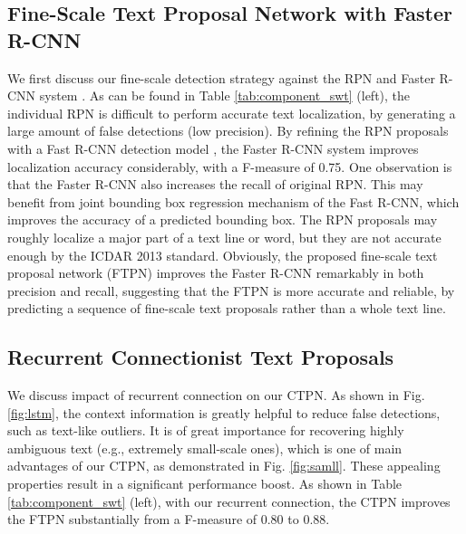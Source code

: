 \documentclass[runningheads]{llncs}
\begin{document}


\subsection{Fine-Scale Text Proposal Network with Faster R-CNN}


We first discuss our fine-scale detection strategy against the RPN and Faster R-CNN system \cite{Ren2015}.  As can be found in Table \ref{tab:component_swt} (left), the individual RPN is difficult to perform accurate text localization, by generating a large amount of false detections (low precision). By refining the RPN proposals with a Fast R-CNN detection model \cite{Girshick2015}, the Faster R-CNN system improves  localization accuracy considerably, with a F-measure of 0.75.  One observation is that the Faster R-CNN also increases the recall of original RPN. This may benefit from joint bounding box regression mechanism of the Fast R-CNN, which improves the accuracy of a predicted bounding box. The RPN proposals may roughly localize a major part of a text line or word, but they are not accurate enough by the ICDAR 2013  standard. Obviously, the proposed fine-scale text proposal network (FTPN) improves the Faster R-CNN remarkably in both precision and recall, suggesting that the FTPN is more accurate and reliable,  by predicting a sequence of fine-scale text proposals rather than a whole  text line. 

\subsection{Recurrent Connectionist Text Proposals}
We discuss  impact of recurrent connection on our CTPN. As shown in Fig. \ref{fig:lstm}, the context information is greatly helpful to reduce false detections, such as text-like outliers. It is of great importance for recovering highly ambiguous text (e.g., extremely small-scale ones), which is one of main advantages of our CTPN, as demonstrated in Fig. \ref{fig:samll}. These appealing properties result in a significant performance boost. As shown in Table \ref{tab:component_swt} (left), with our recurrent connection, the CTPN improves the FTPN substantially from a F-measure of 0.80 to 0.88.
\end{document}
